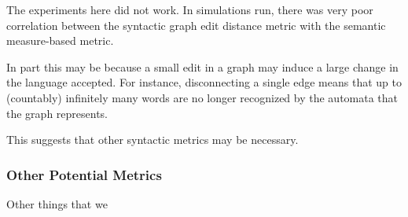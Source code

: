 The experiments here did not work.
In simulations run,
there was very poor correlation between the syntactic graph edit distance
metric with the semantic measure-based metric.

In part this may be because a small edit in a graph may induce a large
change in the language accepted.
For instance, disconnecting a single edge
means that up to (countably) infinitely many words are no longer
recognized by the automata that the graph represents.

This suggests that other syntactic metrics may be necessary.



\subsubsection{Other Potential Metrics}
Other things that we 


